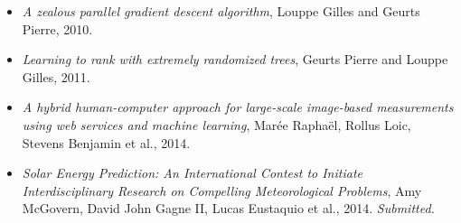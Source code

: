 \begin{itemize}

\item \citep{louppe:2010} \textit{A zealous parallel gradient descent algorithm}, Louppe Gilles and Geurts Pierre, 2010.

\item \citep{geurts:2011} \textit{Learning to rank with extremely randomized trees}, Geurts Pierre and Louppe Gilles, 2011.

\item \citep{maree:2014} \textit{A hybrid human-computer approach for large-scale image-based measurements using web services and machine learning}, Mar{\'e}e Rapha{\"e}l, Rollus Loic, Stevens Benjamin et al., 2014.

\item \citep{amy:2014} \textit{Solar Energy Prediction: An International Contest to Initiate Interdisciplinary Research on Compelling Meteorological Problems}, Amy McGovern, David John Gagne II, Lucas Eustaquio et al., 2014. \textit{Submitted.}

\end{itemize}
